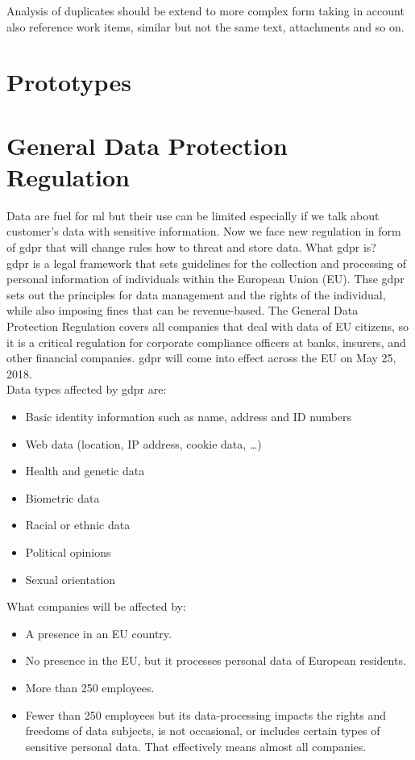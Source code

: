 \documentclass[thesis=M,english]{FITthesis}[2012/06/26]
\begin{document}
Analysis of duplicates should be extend to more complex form taking in account also reference work items, similar but not the same text, attachments and so on.

\chapter{Prototypes}



\chapter{General Data Protection Regulation}

Data are fuel for \acrshort{ml} but their use can be limited especially if we talk about customer's data with sensitive information. Now we face new regulation in form of \acrshort{gdpr} that will change rules how to threat and store data. What \acrshort{gdpr} is?\\

\acrshort{gdpr}\cite{gdpr_info} is a legal framework that sets guidelines for the collection and processing of personal information of individuals within the European Union (EU). Thse \acrshort{gdpr} sets out the principles for data management and the rights of the individual, while also imposing fines that can be revenue-based. The General Data Protection Regulation covers all companies that deal with data of EU citizens, so it is a critical regulation for corporate compliance officers at banks, insurers, and other financial companies. \acrshort{gdpr} will come into effect across the EU on May 25, 2018.\\

Data types affected by \acrshort{gdpr} are:
\begin{itemize}[nosep]
\item Basic identity information such as name, address and ID numbers
\item Web data (location, IP address, cookie data, \dots)
\item Health and genetic data
\item Biometric data
\item Racial or ethnic data
\item Political opinions
\item Sexual orientation\\
\end{itemize}

What companies will be affected by:
\begin{itemize}[nosep]
	\item A presence in an EU country.
	\item No presence in the EU, but it processes personal data of European residents.
	\item More than 250 employees.
	\item Fewer than 250 employees but its data-processing impacts the rights and freedoms of data subjects, is not occasional, or includes certain types of sensitive personal data. That effectively means almost all companies.\\
\end{itemize}
\end{document}
